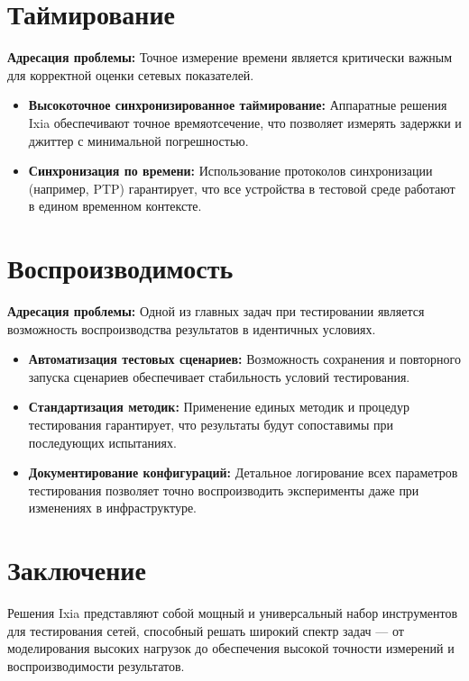 \documentclass[12pt,a4paper]{article}
\begin{document}
\section{Таймирование}
\textbf{Адресация проблемы:} Точное измерение времени является критически важным для корректной оценки сетевых показателей.
\begin{itemize}[leftmargin=2em]
    \item \textbf{Высокоточное синхронизированное таймирование:} Аппаратные решения Ixia обеспечивают точное времяотсечение, что позволяет измерять задержки и джиттер с минимальной погрешностью.
    \item \textbf{Синхронизация по времени:} Использование протоколов синхронизации (например, PTP) гарантирует, что все устройства в тестовой среде работают в едином временном контексте.
\end{itemize}

\section{Воспроизводимость}
\textbf{Адресация проблемы:} Одной из главных задач при тестировании является возможность воспроизводства результатов в идентичных условиях.
\begin{itemize}[leftmargin=2em]
    \item \textbf{Автоматизация тестовых сценариев:} Возможность сохранения и повторного запуска сценариев обеспечивает стабильность условий тестирования.
    \item \textbf{Стандартизация методик:} Применение единых методик и процедур тестирования гарантирует, что результаты будут сопоставимы при последующих испытаниях.
    \item \textbf{Документирование конфигураций:} Детальное логирование всех параметров тестирования позволяет точно воспроизводить эксперименты даже при изменениях в инфраструктуре.
\end{itemize}

\section{Заключение}
Решения Ixia представляют собой мощный и универсальный набор инструментов для тестирования сетей, способный решать широкий спектр задач --- от моделирования высоких нагрузок до обеспечения высокой точности измерений и воспроизводимости результатов. 
\end{document}
